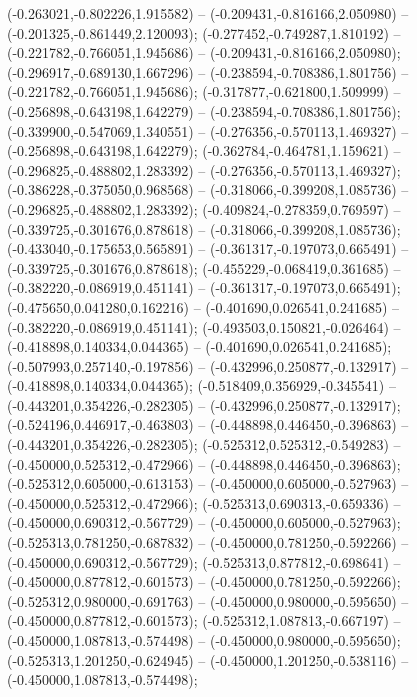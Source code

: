  (-0.263021,-0.802226,1.915582) -- (-0.209431,-0.816166,2.050980) -- (-0.201325,-0.861449,2.120093);
 (-0.277452,-0.749287,1.810192) -- (-0.221782,-0.766051,1.945686) -- (-0.209431,-0.816166,2.050980);
 (-0.296917,-0.689130,1.667296) -- (-0.238594,-0.708386,1.801756) -- (-0.221782,-0.766051,1.945686);
 (-0.317877,-0.621800,1.509999) -- (-0.256898,-0.643198,1.642279) -- (-0.238594,-0.708386,1.801756);
 (-0.339900,-0.547069,1.340551) -- (-0.276356,-0.570113,1.469327) -- (-0.256898,-0.643198,1.642279);
 (-0.362784,-0.464781,1.159621) -- (-0.296825,-0.488802,1.283392) -- (-0.276356,-0.570113,1.469327);
 (-0.386228,-0.375050,0.968568) -- (-0.318066,-0.399208,1.085736) -- (-0.296825,-0.488802,1.283392);
 (-0.409824,-0.278359,0.769597) -- (-0.339725,-0.301676,0.878618) -- (-0.318066,-0.399208,1.085736);
 (-0.433040,-0.175653,0.565891) -- (-0.361317,-0.197073,0.665491) -- (-0.339725,-0.301676,0.878618);
 (-0.455229,-0.068419,0.361685) -- (-0.382220,-0.086919,0.451141) -- (-0.361317,-0.197073,0.665491);
 (-0.475650,0.041280,0.162216) -- (-0.401690,0.026541,0.241685) -- (-0.382220,-0.086919,0.451141);
 (-0.493503,0.150821,-0.026464) -- (-0.418898,0.140334,0.044365) -- (-0.401690,0.026541,0.241685);
 (-0.507993,0.257140,-0.197856) -- (-0.432996,0.250877,-0.132917) -- (-0.418898,0.140334,0.044365);
 (-0.518409,0.356929,-0.345541) -- (-0.443201,0.354226,-0.282305) -- (-0.432996,0.250877,-0.132917);
 (-0.524196,0.446917,-0.463803) -- (-0.448898,0.446450,-0.396863) -- (-0.443201,0.354226,-0.282305);
 (-0.525312,0.525312,-0.549283) -- (-0.450000,0.525312,-0.472966) -- (-0.448898,0.446450,-0.396863);
 (-0.525312,0.605000,-0.613153) -- (-0.450000,0.605000,-0.527963) -- (-0.450000,0.525312,-0.472966);
 (-0.525313,0.690313,-0.659336) -- (-0.450000,0.690312,-0.567729) -- (-0.450000,0.605000,-0.527963);
 (-0.525313,0.781250,-0.687832) -- (-0.450000,0.781250,-0.592266) -- (-0.450000,0.690312,-0.567729);
 (-0.525313,0.877812,-0.698641) -- (-0.450000,0.877812,-0.601573) -- (-0.450000,0.781250,-0.592266);
 (-0.525312,0.980000,-0.691763) -- (-0.450000,0.980000,-0.595650) -- (-0.450000,0.877812,-0.601573);
 (-0.525312,1.087813,-0.667197) -- (-0.450000,1.087813,-0.574498) -- (-0.450000,0.980000,-0.595650);
 (-0.525313,1.201250,-0.624945) -- (-0.450000,1.201250,-0.538116) -- (-0.450000,1.087813,-0.574498);
